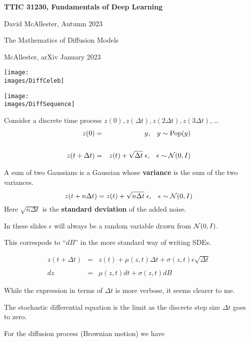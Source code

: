 





{\Huge

  \centerline{\bf TTIC 31230, Fundamentals of Deep Learning}
  \bigskip
  \centerline{David McAllester, Autumn 2023}
  \vfill
  \vfil
  \centerline{The Mathematics of Diffusion Models}
  \vfill
  \centerline{McAllester, arXiv January 2023}
    \vfill
  \vfill


\centerline{\texttt{[image: \\images/DiffCeleb]}}

\centerline{\texttt{[image: \\images/DiffSequence]}}

Consider a discrete time process $z(0),z(\Delta t),z(2\Delta t),z(3\Delta t),\ldots$
{\huge
\begin{eqnarray*}
  z(0) & = & y,\;\;\;y \sim \mathrm{Pop}(y) \\
  \\
  z(t+\Delta t) & = & z(t) + \sqrt{\Delta t}\; \epsilon,\;\;\;\epsilon \sim {\cal N}(0,I)
\end{eqnarray*}
}

A sum of two Gaussians is a Gaussian whose {\bf variance} is the sum of the two variances.
$$z(t+n\Delta t) = z(t) + \sqrt{n\Delta t}\; \epsilon,\;\;\;\epsilon \sim {\cal N}(0,I)$$
Here $\sqrt{n \Delta t}$ is the {\bf standard deviation} of the added noise.

In these slides $\epsilon$ will always be a random variable drawn from ${\cal N}(0,I)$.

\vfill
This correspods to ``$dB$'' in the more standard way of writing SDEs.

{\huge
\begin{eqnarray*}
  z(t+\Delta t) & = & z(t) + \mu(z,t)\Delta t + \sigma(z,t)\epsilon\sqrt{\Delta t} \\
  \\
  dz & = & \mu(z,t)dt + \sigma(z,t)dB
\end{eqnarray*}
}

\vfill
While the expression in terms of $\Delta t$ is more verbose, it seems clearer to me.

The stochastic differential equation is the limit as the discrete step size $\Delta t$ goes to zero.

\vfill
For the diffusion process (Brownian motion) we have

}
